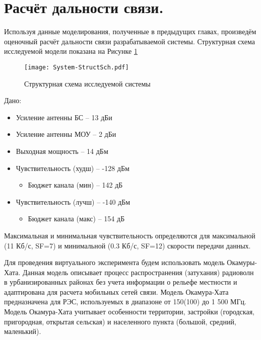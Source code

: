 \section{Расчёт дальности связи.}

Используя данные моделирования, полученные в предыдущих главах, произведём оценочный расчёт дальности связи разрабатываемой системы. Структурная схема исследуемой модели показана на Рисунке \ref{fig:System-StructSch}

\begin{figure}[H]
	\centering
	\texttt{[image: System-StructSch.pdf]}
	\caption{ Структурная схема исследуемой системы}%
	\label{fig:System-StructSch}
\end{figure}

Дано:

\begin{itemize}
	\setlength\itemsep{-1ex}
	\item Усиление антенны БС – 13 дБи
	\item Усиление антенны МОУ – 2 дБи
	\item Выходная мощность – 14 дБм
	\item Чувствительность (худш) – -128 дБм
	\begin{itemize}
		\setlength\itemsep{-1ex}
		\item Бюджет канала (мин) – 142 дБ
	\end{itemize}
	\item Чувствительность (лучш) – -140 дБм
	\begin{itemize}
		\setlength\itemsep{-1ex}
		\item Бюджет канала (макс) – 154 дБ
	\end{itemize}	
\end{itemize}

Максимальная и минимальная чувствительность определяются для максимальной (11 Кб/с, SF=7) и минимальной (0.3 Кб/с, SF=12) скорости передачи данных. 

Для проведения виртуального эксперимента будем использовать модель Окамуры-Хата. Данная модель описывает процесс распространения (затухания) радиоволн в урбанизированных районах без учета информации о рельефе местности и адаптирована для расчета мобильных сетей связи. Модель Окамура-Хата предназначена для РЭС, используемых в диапазоне от 150(100) до 1 500 МГц. Модель Окамура-Хата учитывает особенности территории, застройки (городская, пригородная, открытая сельская) и населенного пункта (большой, средний, маленький).

